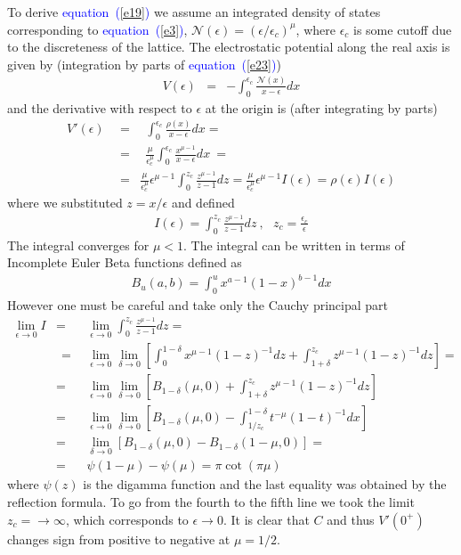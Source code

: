 \documentclass[aps,pre,floats,floatfix,twocolumn]{revtex4}
\newcommand{\beq}{\begin{eqnarray}}
\newcommand{\eeq}{\end{eqnarray}}
\newcommand{\Eq}[1]{\textcolor{blue}{{equation}\!~(\ref{#1})}}
\begin{document}
To derive \Eq{e19} we assume an integrated density of states corresponding to \Eq{e3}, 
${\mathcal{N}(\epsilon) = (\epsilon/\epsilon_c)^{\mu}}$, where $\epsilon_c$ is some cutoff due to the discreteness of the lattice.
The electrostatic potential along the real axis is given by (integration by parts of \Eq{e23})
%
\beq
V(\epsilon) &=& -  \int_0^{\epsilon_c} \frac{\mathcal{N}(x)}{x-\epsilon}dx
\eeq
and the derivative with respect to $\epsilon$ at the origin is (after integrating by parts)
%
\beq
V'(\epsilon) \ \ &=& \ \ \int_0^{\epsilon_c} \frac{\mathcal{\rho}(x)}{x-\epsilon}dx = \\
\ \ &=& \ \   \frac{\mu}{\epsilon_c^{\mu}}\int_0^{\epsilon_c} \frac{x^{\mu-1}}{x-\epsilon}dx \ =  \\
&=&\frac{\mu}{\epsilon_c^{\mu}} \epsilon^{\mu-1} \int_0^{z_c} \frac{z^{\mu-1}}{z-1}dz = 
 \frac{\mu}{\epsilon_c^{\mu}}  \epsilon^{\mu-1}I(\epsilon) = \rho(\epsilon) I(\epsilon)
\eeq
%
where we substituted $z=x/\epsilon$ and defined
%
\beq
I(\epsilon) = \int_0^{z_c} \frac{z^{\mu-1}}{z-1}dz \  , \ \ \ z_c=\frac{\epsilon_c}{\epsilon}
\eeq
%
The integral converges for ${\mu<1}$. 
The integral can be written in terms of Incomplete Euler Beta functions defined as 
%
\beq
B_u(a,b) = \int_0^u x^{a-1}(1-x)^{b-1}dx
\eeq
%
However one must be careful and take only the Cauchy principal part
\beq
\!\!\!\! \lim_{\epsilon \to 0} I  &=& \lim_{\epsilon \to 0}  \int_0^{z_c}\frac{z^{\mu-1}}{z-1}dz =\\
\!\!\!\! & \ \ = \ \ &\lim_{\epsilon \to 0}  \lim_{\delta \to 0} \left[ \int_0^{1-\delta}x^{\mu-1}(1-z)^{-1}dz + 
\int_{1+\delta}^{z_c} z^{\mu-1}(1-z)^{-1}dz \right]= \\
&=&\lim_{\epsilon \to 0}  \lim_{\delta \to 0}  \left[ B_{1-\delta}(\mu,0) + 
\int_{1+\delta}^{z_c} z^{\mu-1}(1-z)^{-1}dz \right]\\
&=&\lim_{\epsilon \to 0}  \lim_{\delta \to 0}  \left[ B_{1-\delta}(\mu,0) - 
\int_{1/z_c}^{1-\delta} t^{-\mu}(1-t)^{-1}dx \right]\\
&=&\lim_{\delta \to 0}  \left[ B_{1-\delta}(\mu,0) - B_{1-\delta}(1-\mu,0) \right] = \\
&=& \psi(1-\mu)-\psi(\mu) = \pi \cot(\pi \mu)
\eeq
%
where $\psi(z)$ is the digamma function and the last equality was obtained by the reflection formula. 
%
To go from the fourth to the fifth line  we took the limit $z_c=\to \infty$, which corresponds to $\epsilon\to0$.
%
It is clear that $C$ and thus $V'(0^+)$ changes sign from positive to negative at $\mu=1/2$.\\
\end{document}
